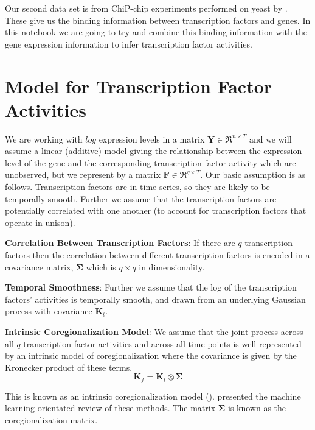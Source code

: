 Our second data set is from ChiP-chip experiments performed on yeast by \cite{Lee:2002}. 
These give us the binding information between transcription factors and genes. 
In this notebook we are going to try and combine this binding information with 
the gene expression information to infer transcription factor activities.

\section{Model for Transcription Factor Activities}

We are working with $log$ expression levels in a matrix $\mathbf{Y} \in \Re^{n\times T}$ and 
we will assume a linear (additive) model giving the relationship between the expression level 
of the gene and the corresponding transcription factor activity which are unobserved, but we 
represent by a matrix $\mathbf{F} \in \Re^{q\times T}$. Our basic assumption is as follows. 
Transcription factors are in time series, so they are likely to be temporally smooth. 
Further we assume that the transcription factors are potentially correlated with one another 
(to account for transcription factors that operate in unison). 

\textbf{Correlation Between Transcription Factors}:  
If there are $q$ transcription factors then the correlation between different transcription factors is 
encoded in a covariance matrix, $\boldsymbol{\Sigma}$ which is $q\times q$ in dimensionality. 

\textbf{Temporal Smoothness}: 
Further we assume that the log of the transcription factors' activities is temporally smooth, 
and drawn from an underlying Gaussian process with covariance $\mathbf{K}_t$. 

\textbf{ Intrinsic Coregionalization Model}: 
We assume that the joint process across all $q$ transcription factor activities and across all time points 
is well represented by an intrinsic model of coregionalization where the covariance is given by the 
Kronecker product of these terms.
\begin{equation} \label{eq:K}
  \mathbf{K}_f = \mathbf{K}_t \otimes \boldsymbol{\Sigma}
\end{equation}

This is known as an intrinsic coregionalization model (\cite{Wackernagel:2003}). 
\cite{Alvarez:2012} presented the machine learning orientated review of these methods. 
The matrix $\boldsymbol{\Sigma}$ is known as the coregionalization matrix.

